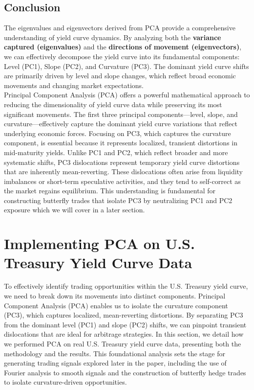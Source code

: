 \documentclass[12pt]{article}
\begin{document}
\subsection{Conclusion}

The eigenvalues and eigenvectors derived from PCA provide a comprehensive understanding of yield curve dynamics. By analyzing both the \textbf{variance captured (eigenvalues)} and the \textbf{directions of movement (eigenvectors)}, we can effectively decompose the yield curve into its fundamental components: Level (PC1), Slope (PC2), and Curvature (PC3). The dominant yield curve shifts are primarily driven by level and slope changes, which reflect broad economic movements and changing market expectations.\\

Principal Component Analysis (PCA) offers a powerful mathematical approach to reducing the dimensionality of yield curve data while preserving its most significant movements. The first three principal components—level, slope, and curvature—effectively capture the dominant yield curve variations that reflect underlying economic forces. Focusing on PC3, which captures the curvature component, is essential because it represents localized, transient distortions in mid-maturity yields. Unlike PC1 and PC2, which reflect broader and more systematic shifts, PC3 dislocations represent temporary yield curve distortions that are inherently mean-reverting. These dislocations often arise from liquidity imbalances or short-term speculative activities, and they tend to self-correct as the market regains equilibrium. This understanding is fundamental for constructing butterfly trades that isolate PC3 by neutralizing PC1 and PC2 exposure which we will cover in a later section.

\vspace{3em}

\section{Implementing PCA on U.S. Treasury Yield Curve Data}

To effectively identify trading opportunities within the U.S. Treasury yield curve, we need to break down its movements into distinct components. Principal Component Analysis (PCA) enables us to isolate the curvature component (PC3), which captures localized, mean-reverting distortions. By separating PC3 from the dominant level (PC1) and slope (PC2) shifts, we can pinpoint transient dislocations that are ideal for arbitrage strategies. In this section, we detail how we performed PCA on real U.S. Treasury yield curve data, presenting both the methodology and the results. This foundational analysis sets the stage for generating trading signals explored later in the paper, including the use of Fourier analysis to smooth signals and the construction of butterfly hedge trades to isolate curvature-driven opportunities.
\end{document}
